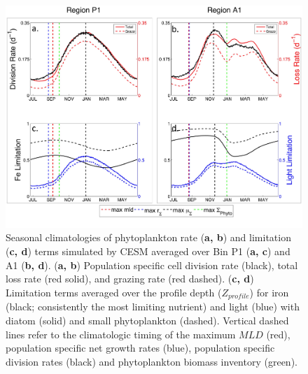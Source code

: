 \begin{figure}[!htbp]
\begin{adjustwidth}{-1in}{-1in}
 \centering
 \includegraphics[scale=.18]{figures/Ch2/Figure_4.jpg}
\end{adjustwidth}
\caption[Simulated seasonal climatologies of phytoplankton rate and limitation terms; Bin P1 and A1]{Seasonal climatologies of phytoplankton rate (\textbf{a, b}) and limitation (\textbf{c, d}) terms simulated by CESM averaged over Bin P1 (\textbf{a, c}) and A1 (\textbf{b, d}). (\textbf{a, b}) Population specific cell division rate (black), total loss rate (red solid), and grazing rate (red dashed). (\textbf{c, d}) Limitation terms averaged over the profile depth ($Z_{profile}$) for iron (black; consistently the most limiting nutrient) and light (blue) with diatom (solid) and small phytoplankton (dashed). Vertical dashed lines refer to the climatologic timing of the maximum $MLD$ (red), population specific net growth rates (blue), population specific division rates (black) and phytoplankton biomass inventory (green).
}
\label{fig:Fig4}
\end{figure}


